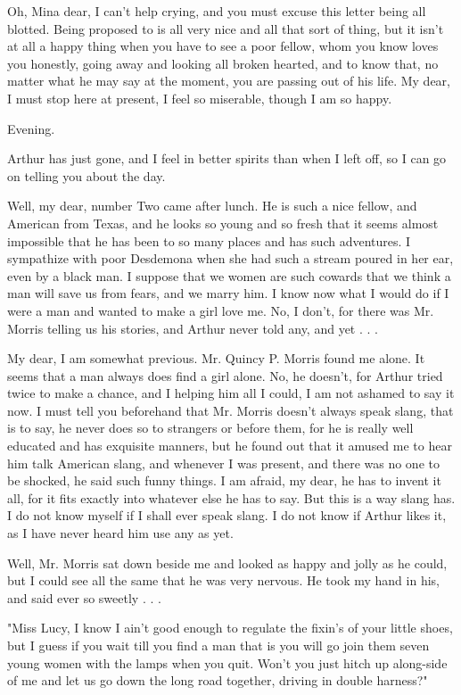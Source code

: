 Oh, Mina dear, I can't help crying, and you must excuse this letter being all blotted. Being proposed to is all very nice and all that sort of thing, but it isn't at all a happy thing when you have to see a poor fellow, whom you know loves you honestly, going away and looking all broken hearted, and to know that, no matter what he may say at the moment, you are passing out of his life. My dear, I must stop here at present, I feel so miserable, though I am so happy. 

Evening. 

Arthur has just gone, and I feel in better spirits than when I left off, so I can go on telling you about the day. 

Well, my dear, number Two came after lunch. He is such a nice fellow, and American from Texas, and he looks so young and so fresh that it seems almost impossible that he has been to so many places and has such adventures. I sympathize with poor Desdemona when she had such a stream poured in her ear, even by a black man. I suppose that we women are such cowards that we think a man will save us from fears, and we marry him. I know now what I would do if I were a man and wanted to make a girl love me. No, I don't, for there was Mr. Morris telling us his stories, and Arthur never told any, and yet . . . 

My dear, I am somewhat previous. Mr. Quincy P. Morris found me alone. It seems that a man always does find a girl alone. No, he doesn't, for Arthur tried twice to make a chance, and I helping him all I could, I am not ashamed to say it now. I must tell you beforehand that Mr. Morris doesn't always speak slang, that is to say, he never does so to strangers or before them, for he is really well educated and has exquisite manners, but he found out that it amused me to hear him talk American slang, and whenever I was present, and there was no one to be shocked, he said such funny things. I am afraid, my dear, he has to invent it all, for it fits exactly into whatever else he has to say. But this is a way slang has. I do not know myself if I shall ever speak slang. I do not know if Arthur likes it, as I have never heard him use any as yet. 

Well, Mr. Morris sat down beside me and looked as happy and jolly as he could, but I could see all the same that he was very nervous. He took my hand in his, and said ever so sweetly . . . 

"Miss Lucy, I know I ain't good enough to regulate the fixin's of your little shoes, but I guess if you wait till you find a man that is you will go join them seven young women with the lamps when you quit. Won't you just hitch up along-side of me and let us go down the long road together, driving in double harness?" 

